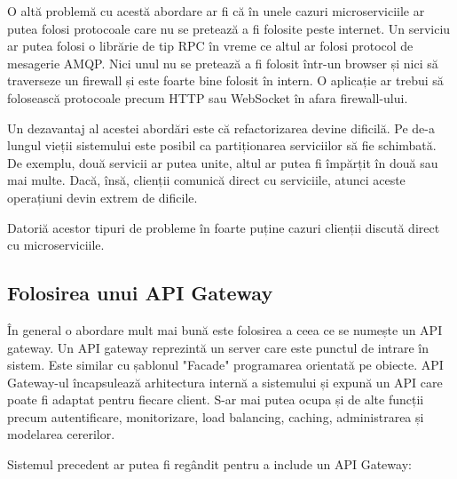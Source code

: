 \documentclass[12pt, a4paper, oneside, romanian]{teza-upb}
\begin{document}
O altă problemă cu acestă abordare ar fi că în unele cazuri microserviciile ar putea folosi protocoale care nu se pretează a fi folosite peste internet. Un serviciu ar putea folosi o librărie de tip RPC în vreme ce altul ar folosi protocol de mesagerie AMQP. Nici unul nu se pretează a fi folosit într-un browser și nici să traverseze un firewall și este foarte bine folosit în intern. O aplicație ar trebui să folosească protocoale precum HTTP sau WebSocket în afara firewall-ului. 

Un dezavantaj al acestei abordări este că refactorizarea devine dificilă. Pe de-a lungul vieții sistemului este posibil ca partiționarea serviciilor să fie schimbată. De exemplu, două servicii ar putea unite, altul ar putea fi împărțit în două sau mai multe.  Dacă, însă, clienții comunică direct cu serviciile, atunci aceste operațiuni devin extrem de dificile. 

Datoriă acestor tipuri de probleme în foarte puține cazuri clienții discută direct cu microserviciile. 

\subsection{Folosirea unui API Gateway}

În general o abordare mult mai bună este folosirea a ceea ce se numește un API gateway. Un API gateway reprezintă un server care este punctul de intrare în sistem. Este similar cu șablonul "Facade" programarea orientată pe obiecte. API Gateway-ul încapsulează arhitectura internă a sistemului și expună un API care poate fi adaptat pentru fiecare client. S-ar mai putea ocupa și de alte funcții precum autentificare, monitorizare, load balancing, caching, administrarea și modelarea cererilor. 

Sistemul precedent ar putea fi regândit pentru a include un API Gateway: 
\end{document}
